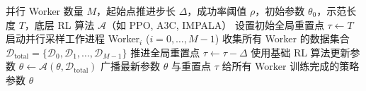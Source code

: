 \documentclass{article}
\begin{document}
\begin{algorithm}[H]
\caption{中央优化器 (Central Optimizer)}
\label{alg:optimizer}
\begin{algorithmic}[1]
\Require 并行 Worker 数量 $M$，起始点推进步长 $\Delta$，成功率阈值 $\rho$，初始参数 $\theta_0$，示范长度 $T$，底层 RL 算法 $\mathcal{A}$（如 PPO, A3C, IMPALA）
\State 设置初始全局重置点 $\tau \leftarrow T$ 
\State 启动并行采样工作进程 Worker$_i$ ($i = 0, \dots, M-1$)
    \State 收集所有 Worker 的数据集合 $\mathcal{D}_{\text{total}} = \{\mathcal{D}_0, \mathcal{D}_1, \dots, \mathcal{D}_{M-1}\}$
     
        \State 推进全局重置点 $\tau \leftarrow \tau - \Delta$ 
    \EndIf
    \State 使用基础 RL 算法更新参数 $\theta \leftarrow \mathcal{A}(\theta, \mathcal{D}_{\text{total}})$ 
    \State 广播最新参数 $\theta$ 与重置点 $\tau$ 给所有 Worker
\EndWhile
\Ensure 训练完成的策略参数 $\theta$ 
\end{algorithmic}
\end{algorithm}
\end{document}
